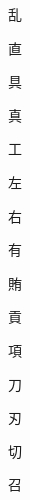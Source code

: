 \begin{spacing}{2.5}
{\Huge \begin{CJK}{UTF8}{min} 乱\end{CJK}}\hspace{0.1cm}
{\Huge \begin{CJK}{UTF8}{min} 直\end{CJK}}\hspace{0.1cm}
{\Huge \begin{CJK}{UTF8}{min} 具\end{CJK}}\hspace{0.1cm}
{\Huge \begin{CJK}{UTF8}{min} 真\end{CJK}}\hspace{0.1cm}
{\Huge \begin{CJK}{UTF8}{min} 工\end{CJK}}\hspace{0.1cm}
{\Huge \begin{CJK}{UTF8}{min} 左\end{CJK}}\hspace{0.1cm}
{\Huge \begin{CJK}{UTF8}{min} 右\end{CJK}}\hspace{0.1cm}
{\Huge \begin{CJK}{UTF8}{min} 有\end{CJK}}\hspace{0.1cm}
{\Huge \begin{CJK}{UTF8}{min} 賄\end{CJK}}\hspace{0.1cm}
{\Huge \begin{CJK}{UTF8}{min} 貢\end{CJK}}\hspace{0.1cm}
{\Huge \begin{CJK}{UTF8}{min} 項\end{CJK}}\hspace{0.1cm}
{\Huge \begin{CJK}{UTF8}{min} 刀\end{CJK}}\hspace{0.1cm}
{\Huge \begin{CJK}{UTF8}{min} 刃\end{CJK}}\hspace{0.1cm}
{\Huge \begin{CJK}{UTF8}{min} 切\end{CJK}}\hspace{0.1cm}
{\Huge \begin{CJK}{UTF8}{min} 召\end{CJK}}\hspace{0.1cm}

\end{spacing}
